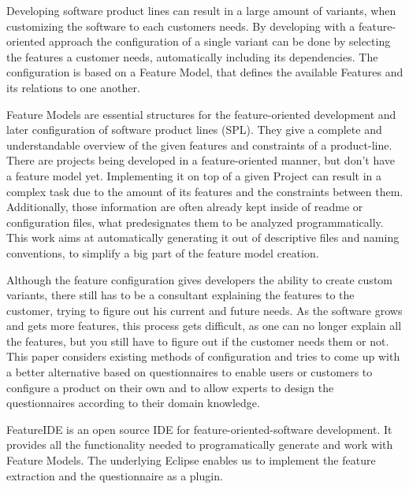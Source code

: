 % 
% 
% 
% 
Developing software product lines can result in a large amount of variants, when customizing the software to each customers needs. By developing with a feature-oriented approach the configuration of a single variant can be done by selecting the features a customer needs, automatically including its dependencies. The configuration is based on a Feature Model, that defines the available Features and its relations to one another.

Feature Models are essential structures for the feature-oriented development and later configuration of software product lines (SPL). They give a complete and understandable overview of the given features and constraints of a product-line. There are projects being developed in a feature-oriented manner, but don't have a feature model yet. Implementing it on top of a given Project can result in a complex task due to the amount of its features and the constraints between them. Additionally, those information are often already kept inside of readme or configuration files, what predesignates them to be analyzed programmatically. This work aims at automatically generating it out of descriptive files and naming conventions, to simplify a big part of the feature model creation.

Although the feature configuration gives developers the ability to create custom variants, there still has to be a consultant explaining the features to the customer, trying to figure out his current and future needs. As the software grows and gets more features, this process gets difficult, as one can no longer explain all the features, but you still have to figure out if the customer needs them or not. This paper considers existing methods of configuration and tries to come up with a better alternative based on questionnaires to enable users or customers to configure a product on their own and to allow experts to design the questionnaires according to their domain knowledge.
 
FeatureIDE is an open source IDE for feature-oriented-software development. It provides all the functionality needed to programatically generate and work with Feature Models. The underlying Eclipse enables us to implement the feature extraction and the questionnaire as a plugin.

